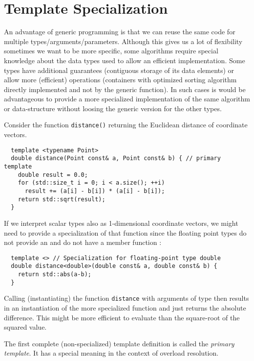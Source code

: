 \chapter{Template Specialization}
An advantage of generic programming is that we can reuse the same code for multiple types/arguments/parameters. Although this gives us a lot of flexibility
sometimes we want to be more specific, \ie some algorithms require special knowledge about the data types used to allow an efficient implementation. Some
types have additional guarantees (\eg contiguous storage of its data elements) or allow more (efficient) operations (\eg containers with optimized sorting
algorithm directly implemented and not by the generic  function). In such cases is would be advantageous to provide a more specialized implementation
of the same algorithm or data-structure without loosing the generic version for the other types.

\begin{example}
  Consider the function \texttt{distance()} returning the Euclidean distance of coordinate vectors.
  \begin{verbatim}
  template <typename Point>
  double distance(Point const& a, Point const& b) { // primary template
    double result = 0.0;
    for (std::size_t i = 0; i < a.size(); ++i)
      result += (a[i] - b[i]) * (a[i] - b[i]);
    return std::sqrt(result);
  }
  \end{verbatim}
  If we interpret scalar types also as 1-dimensional coordinate vectors, we might need to provide a specialization of that function
  since the floating point types do not provide an  and do not have a member function :
  \begin{verbatim}
  template <> // Specialization for floating-point type double
  double distance<double>(double const& a, double const& b) {
    return std::abs(a-b);
  }
  \end{verbatim}
  Calling (instantiating) the function \texttt{distance} with arguments of type  then results in an instantiation of the more specialized
  function and just returns the absolute difference. This might be more efficient to evaluate than the square-root of the squared value.
\end{example}

\begin{defn}
  The first complete (non-specialized) template definition is called the \emph{primary template}. It has a special meaning in the context of overload resolution.
\end{defn}

